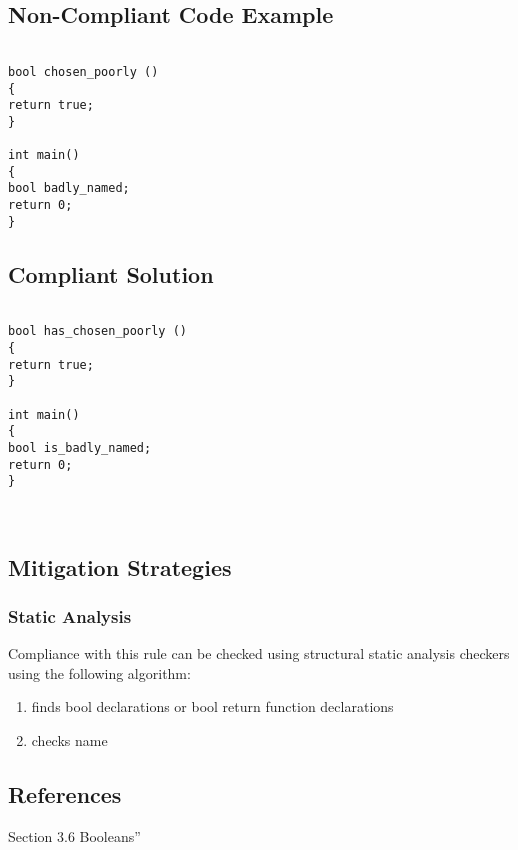 \subsection{Non-Compliant Code Example}


\begin{verbatim}

bool chosen_poorly ()
{
return true;
}

int main()
{
bool badly_named;
return 0;
}

\end{verbatim}

\subsection{Compliant Solution}


\begin{verbatim}

bool has_chosen_poorly ()
{
return true;
}

int main()
{
bool is_badly_named;
return 0;
}



\end{verbatim}

\subsection{Mitigation Strategies}
\subsubsection{Static Analysis} 

Compliance with this rule can be checked using structural static analysis checkers using the following algorithm:

\begin{enumerate}
\item finds bool declarations or bool return function declarations
\item checks name
\end{enumerate}

\subsection{References}

 Section 3.6 Booleans''
